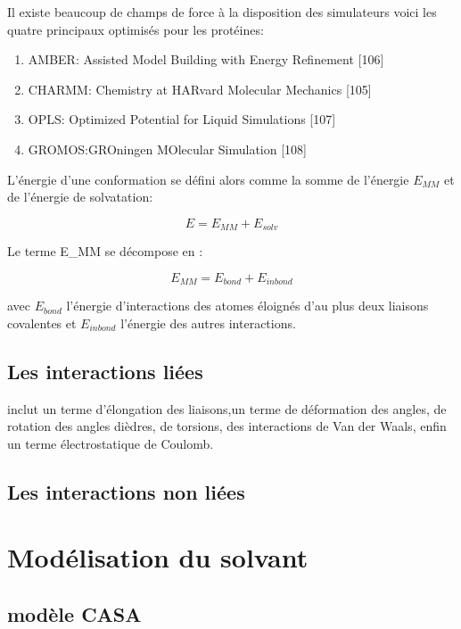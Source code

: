Il existe beaucoup de champs de force à la disposition des simulateurs voici les quatre principaux optimisés pour les protéines:

\begin{enumerate}
\item AMBER: Assisted Model Building with Energy Refinement [106]
\item CHARMM: Chemistry at HARvard Molecular Mechanics [105]
\item OPLS: Optimized Potential for Liquid Simulations [107]
\item GROMOS:GROningen MOlecular Simulation [108]
\end{enumerate}

L'énergie d'une conformation se défini alors comme la somme de l'énergie $E_{MM}$  et de l'énergie de solvatation:

\begin{equation}
  E = E_{MM} + E_{solv}
\end{equation}

Le terme E_{MM} se décompose en :

\begin{equation}
  E_{MM} = E_{bond} + E_{inbond}
\end{equation}

avec $E_{bond}$ l'énergie d'interactions des atomes éloignés d'au plus deux liaisons covalentes et $E_{inbond}$  l'énergie des autres interactions.

\subsection{Les interactions liées }



inclut un terme d'élongation des liaisons,un terme de déformation des angles, de rotation des angles dièdres, de torsions, des interactions de Van der Waals, enfin un terme électrostatique de Coulomb. 



\subsection{Les interactions non liées}
\section{Modélisation du solvant}
\subsection{modèle CASA}

